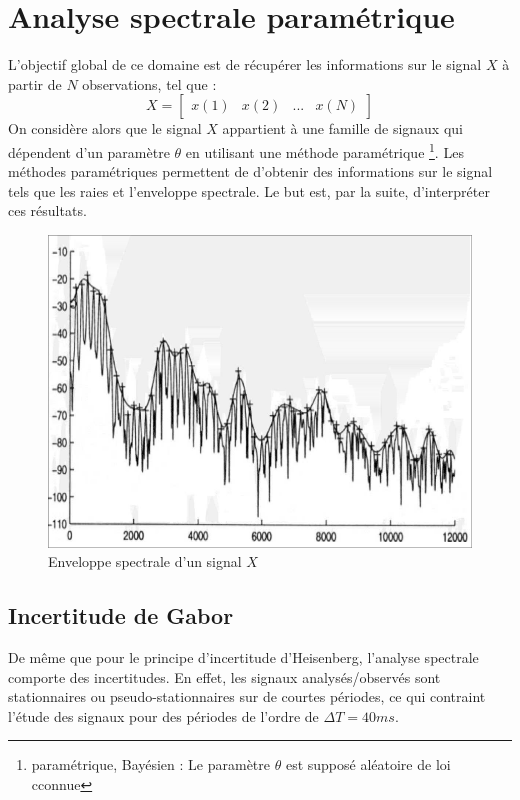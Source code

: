\chapter{Analyse spectrale paramétrique}
\noindent L'objectif global de ce domaine est de récupérer les informations sur le signal $X$ à partir de $N$ observations, tel que :
    \[ X =
    \begin{bmatrix}
        x(1) & x(2) & ... & x(N)
    \end{bmatrix}
    \]
\noindent On considère alors que le signal $X$ appartient à une famille de signaux qui dépendent d'un paramètre $\theta$ en utilisant une méthode paramétrique \footnote{paramétrique, Bayésien : Le paramètre $\theta$ est supposé aléatoire de loi cconnue}.
Les méthodes paramétriques permettent de d'obtenir des informations sur le signal tels que les raies et l'enveloppe spectrale. Le but est, par la suite, d'interpréter ces résultats.
\begin{figure}[hbt!]
    \centering
    \includegraphics[scale=0.5]{Pics/Enveloppe.png}
    \caption{Enveloppe spectrale d'un signal $X$}
\end{figure}
\newpage
\section{Incertitude de Gabor}
\noindent De même que pour le principe d'incertitude d'Heisenberg, l'analyse spectrale comporte des incertitudes. En effet, les signaux analysés/observés sont stationnaires ou pseudo-stationnaires sur de courtes périodes, ce qui contraint l'étude des signaux pour des périodes de l'ordre de $\Delta T = 40ms$. \newline

